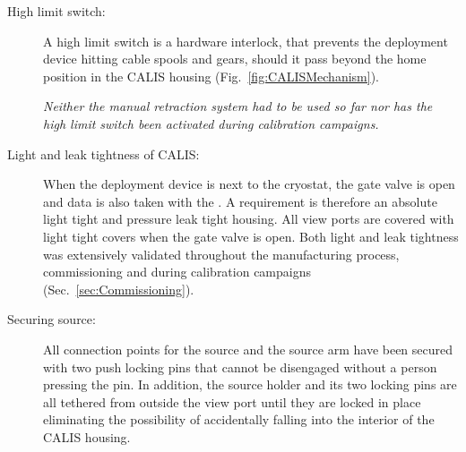 \begin{description}
\item[High limit switch:]
A high limit switch is a hardware interlock, that prevents the deployment device hitting cable spools and gears, should it pass beyond the home position in the CALIS housing (Fig.~\ref{fig:CALISMechanism}). 

\textit{Neither the manual retraction system had to be used so far nor has the high limit switch been activated during calibration campaigns.}
    
\item[Light and leak tightness of CALIS:]
When the deployment device is next to the cryostat, the gate valve is open and data is also taken with the \lsv. A requirement is therefore an absolute light tight and pressure leak tight housing. All view ports are covered with light tight covers when the gate valve is open. Both light and leak tightness was extensively validated throughout the manufacturing process, commissioning and during calibration campaigns (Sec.~\ref{sec:Commissioning}).

\item[Securing source:] 
All connection points for the source and the source arm have been secured with two push locking pins that cannot be disengaged without a person pressing the pin. In addition, the source holder and its two locking pins are all tethered from outside the view port until they are locked in place eliminating the possibility of accidentally falling into the interior of the CALIS housing.

\end{description}
	
